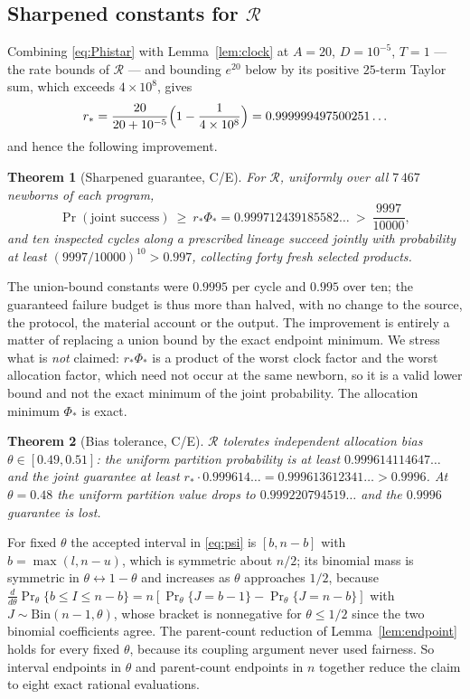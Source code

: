 \documentclass[11pt]{article}
\theoremstyle{plain}
\newtheorem{theorem}{Theorem}[section]
\theoremstyle{definition}
\theoremstyle{remark}
\newcommand{\Bin}{\mathrm{Bin}}
\begin{document}
\subsection{Sharpened constants for $\mathcal{R}$}

Combining \eqref{eq:Phistar} with Lemma~\ref{lem:clock} at $A=20$,
$D=10^{-5}$, $T=1$ --- the rate bounds of $\mathcal{R}$ --- and
bounding $e^{20}$ below by its positive $25$-term Taylor sum, which exceeds
$4\times10^{8}$, gives
\begin{equation}\label{eq:rstar}
r_*=\frac{20}{20+10^{-5}}\Bigl(1-\frac{1}{4\times10^{8}}\Bigr)
=0.999999497500251\ldots
\end{equation}
and hence the following improvement.

\begin{theorem}[Sharpened guarantee, C/E]\label{thm:sharp}
For $\mathcal{R}$, uniformly over all $7\,467$
newborns of each program,
\[
\Pr(\text{joint success})\ \ge\ r_*\Phi_*=0.999712439185582\ldots\ >\
\frac{9997}{10000},
\]
and ten inspected cycles along a prescribed lineage succeed
jointly with probability at least $(9997/10000)^{10}>0.997$, collecting
forty fresh selected products.
\end{theorem}

The union-bound constants were $0.9995$ per cycle and $0.995$ over
ten; the guaranteed failure budget is thus more than halved, with no change to
the source, the protocol, the material account or the output. The
improvement is entirely a matter of replacing a union bound by the exact
endpoint minimum. We stress what is \emph{not} claimed: $r_*\Phi_*$ is a
product of the worst clock factor and the worst allocation factor, which need
not occur at the same newborn, so it is a valid lower bound and not the exact
minimum of the joint probability. The allocation minimum $\Phi_*$ is exact.

\begin{theorem}[Bias tolerance, C/E]\label{thm:biasprop}
$\mathcal{R}$ tolerates independent allocation bias $\theta\in[0.49,0.51]$:
the uniform partition probability is at least $0.999614114647\ldots$ and the
joint guarantee at least $r_*\cdot0.999614\ldots=0.999613612341\ldots>0.9996$.
At $\theta=0.48$ the uniform partition value drops to
$0.999220794519\ldots$ and the $0.9996$ guarantee is lost.
\end{theorem}

For fixed $\theta$ the accepted interval in \eqref{eq:psi} is
$[b,n-b]$ with $b=\max(l,n-u)$, which is symmetric about $n/2$; its binomial
mass is symmetric in $\theta\leftrightarrow1-\theta$ and increases as $\theta$
approaches $1/2$, because
$\frac{d}{d\theta}\Pr_\theta\{b\le I\le n-b\}
=n[\Pr_\theta\{J=b-1\}-\Pr_\theta\{J=n-b\}]$ with $J\sim\Bin(n-1,\theta)$,
whose bracket is nonnegative for $\theta\le1/2$ since the two binomial
coefficients agree. The parent-count reduction of Lemma~\ref{lem:endpoint}
holds for every fixed $\theta$, because its coupling argument never used
fairness. So interval endpoints in $\theta$ and parent-count endpoints in $n$
together reduce the claim to eight exact rational evaluations.
\end{document}
